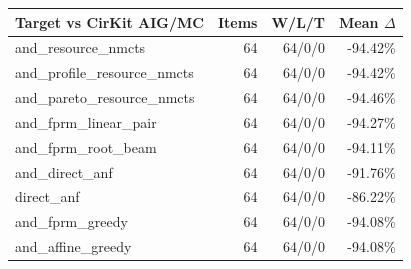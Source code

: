 \begin{tabular}{lrrr}
\toprule
Target vs CirKit AIG/MC & Items & W/L/T & Mean $\Delta$ \\
\midrule
and\_resource\_nmcts & 64 & 64/0/0 & -94.42\% \\
and\_profile\_resource\_nmcts & 64 & 64/0/0 & -94.42\% \\
and\_pareto\_resource\_nmcts & 64 & 64/0/0 & -94.46\% \\
and\_fprm\_linear\_pair & 64 & 64/0/0 & -94.27\% \\
and\_fprm\_root\_beam & 64 & 64/0/0 & -94.11\% \\
and\_direct\_anf & 64 & 64/0/0 & -91.76\% \\
direct\_anf & 64 & 64/0/0 & -86.22\% \\
and\_fprm\_greedy & 64 & 64/0/0 & -94.08\% \\
and\_affine\_greedy & 64 & 64/0/0 & -94.08\% \\
\bottomrule
\end{tabular}
